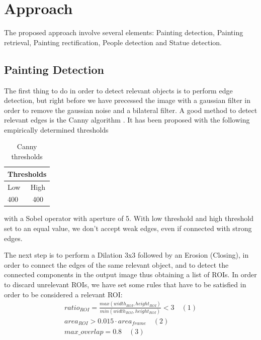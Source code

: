 \documentclass[10pt,twocolumn,letterpaper]{article}
\begin{document}
\section{Approach}

The proposed approach involve several elements: Painting detection, Painting retrieval, 
Painting rectification, People detection and Statue detection.

\subsection{Painting Detection}

The first thing to do in order to detect relevant objects is to perform edge detection, but right before we have 
precessed the image with a gaussian filter in order to remove the gaussian noise and a bilateral filter. 
A good method to detect relevant edges is the Canny algorithm \cite{canny}. It has been proposed with the following empirically determined thresholds 

\begin{table}[h!]
\begin{center}
\begin{tabular}{|l|c|}
\hline
\multicolumn{2}{|c|}{Thresholds}  \\
\hline
Low & High \\
\hline
400 & 400 \\ 
\hline
\end{tabular}
\caption{Canny thresholds}
\end{center}
\end{table}

with a Sobel operator \cite{otsu} with aperture of 5. With low threshold and high threshold set to an equal value, we don't accept weak edges, even if connected with strong edges.

The next step is to perform a Dilation 3x3 followed by an Erosion (Closing), in order to 
connect the edges of the same relevant object, and to detect the connected components in the output image 
thus obtaining a list of ROIs.
In order to discard unrelevant ROIs, we have set some rules that have to be satisfied in order to be considered
a relevant ROI: 
\begin{gather*}
	ratio_{ROI} =  \frac{max(width_{ROI}, height_{ROI})}{min(width_{ROI}, height_{ROI})} <  3 \quad (1)\\
	area_{ROI} > 0.015 \cdot area_{frame} \quad (2)\\ 
	max\_overlap = 0.8 \quad (3)
\end{gather*}
\end{document}
